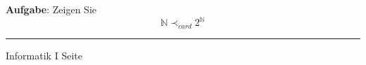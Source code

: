 \begin{slide}{}
\normalsize
\textbf{Aufgabe}: Zeigen Sie 
$$   \mathbb{N} \prec_{card} 2^\mathbb{N} $$
\vspace{0.5cm}





\vspace*{\fill}
\tiny \addtocounter{mypage}{1}
\rule{15cm}{1mm}
Informatik I  \hspace*{\fill} Seite 
\end{slide}


